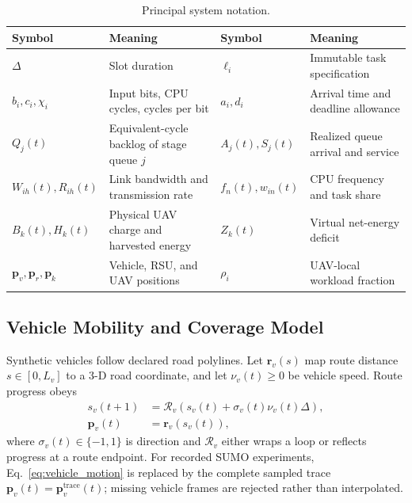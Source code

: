 \documentclass[journal]{IEEEtran}
\begin{document}
\begin{table}[t]
\centering
\caption{Principal system notation.}
\label{tab:notation}
\renewcommand{\arraystretch}{1.12}
\begin{tabular}{p{}p{}p{}p{}}
\hline
\textbf{Symbol} & \textbf{Meaning} & \textbf{Symbol} & \textbf{Meaning}\\
\hline
$\Delta$ & Slot duration &
$\ell_i$ & Immutable task specification\\
$b_i,c_i,\chi_i$ & Input bits, CPU cycles, cycles per bit &
$a_i,d_i$ & Arrival time and deadline allowance\\
$Q_j(t)$ & Equivalent-cycle backlog of stage queue $j$ &
$A_j(t),S_j(t)$ & Realized queue arrival and service\\
$W_{ih}(t),R_{ih}(t)$ & Link bandwidth and transmission rate &
$f_n(t),w_{in}(t)$ & CPU frequency and task share\\
$B_k(t),H_k(t)$ & Physical UAV charge and harvested energy &
$Z_k(t)$ & Virtual net-energy deficit\\
$\boldsymbol p_v,\boldsymbol p_r,\boldsymbol p_k$ &
Vehicle, RSU, and UAV positions &
$\rho_i$ & UAV-local workload fraction\\
\hline
\end{tabular}
\end{table}

\subsection{Vehicle Mobility and Coverage Model}
Synthetic vehicles follow declared road polylines.  Let
$\boldsymbol r_v(s)$ map route distance $s\in[0,L_v]$ to a 3-D road
coordinate, and let $\nu_v(t)\ge0$ be vehicle speed.  Route progress
obeys
\begin{equation}
\begin{aligned}
s_v(t+1)&=\mathscr R_v\!\left(
s_v(t)+\sigma_v(t)\nu_v(t)\Delta\right),\\
\boldsymbol p_v(t)&=\boldsymbol r_v(s_v(t)),
\end{aligned}
\label{eq:vehicle_motion}
\end{equation}
where $\sigma_v(t)\in\{-1,1\}$ is direction and
$\mathscr R_v$ either wraps a loop or reflects progress at a route
endpoint.  For recorded SUMO experiments, Eq.~\eqref{eq:vehicle_motion}
is replaced by the complete sampled trace
$\boldsymbol p_v(t)=\boldsymbol p_v^{\mathrm{trace}}(t)$; missing
vehicle frames are rejected rather than interpolated.
\end{document}
